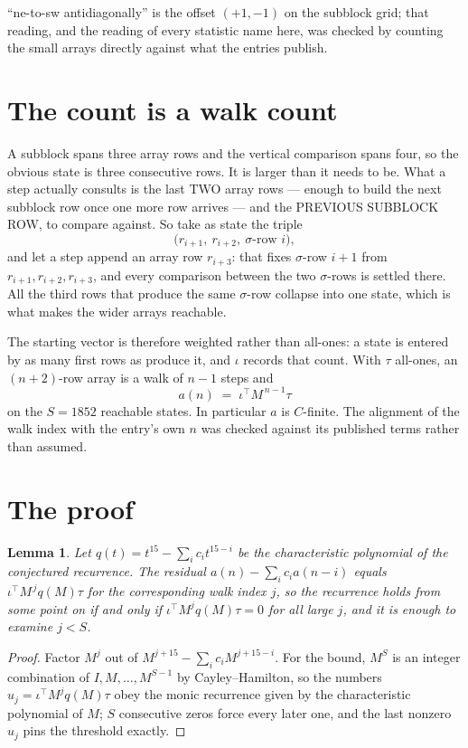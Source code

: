 \documentclass[11pt,a4paper]{article}
\theoremstyle{plain}
\newtheorem{lemma}[theorem]{Lemma}
\theoremstyle{definition}
\begin{document}
``ne-to-sw antidiagonally'' is the offset $(+1,-1)$ on the subblock grid; that reading, and
the reading of every statistic name here, was checked by counting the small arrays directly
against what the entries publish.

\section{The count is a walk count}

A subblock spans three array rows and the vertical comparison spans four, so the obvious state
is three consecutive rows. It is larger than it needs to be. What a step actually consults is
the last TWO array rows --- enough to build the next subblock row once one more row arrives ---
and the PREVIOUS SUBBLOCK ROW, to compare against. So take as state the triple
\[
\bigl(r_{i+1},\ r_{i+2},\ \sigma\text{-row }i\bigr),
\]
and let a step append an array row $r_{i+3}$: that fixes $\sigma$-row $i+1$ from
$r_{i+1},r_{i+2},r_{i+3}$, and every comparison between the two $\sigma$-rows is settled
there. All the third rows that produce the same $\sigma$-row collapse into one state, which is
what makes the wider arrays reachable.

The starting vector is therefore weighted rather than all-ones: a state is entered by as many
first rows as produce it, and $\iota$ records that count. With $\tau$ all-ones, an
$(n+2)$-row array is a walk of $n-1$ steps and
\[
a(n)\;=\;\iota^{\!\top}M^{\,n-1}\tau
\]
on the $S=1852$ reachable states. In particular $a$ is $C$-finite. The alignment of the walk
index with the entry's own $n$ was checked against its published terms rather than assumed.

\section{The proof}

\begin{lemma}\label{lem:crit}
Let $q(t)=t^{15}-\sum_i c_it^{15-i}$ be the characteristic polynomial of the
conjectured recurrence. The residual $a(n)-\sum_ic_ia(n-i)$ equals
$\iota^{\!\top}M^{\,j}q(M)\tau$ for the corresponding walk index $j$, so the recurrence
holds from some point on if and only if $\iota^{\!\top}M^{j}q(M)\tau=0$ for all large $j$,
and it is enough to examine $j<S$.
\end{lemma}

\begin{proof}
Factor $M^{j}$ out of $M^{j+15}-\sum_ic_iM^{j+15-i}$. For the bound, $M^{S}$
is an integer combination of $I,M,\dots,M^{S-1}$ by Cayley--Hamilton, so the numbers
$u_j=\iota^{\!\top}M^{j}q(M)\tau$ obey the monic recurrence given by the characteristic
polynomial of $M$; $S$ consecutive zeros force every later one, and the last nonzero $u_j$
pins the threshold exactly.
\end{proof}
\end{document}
